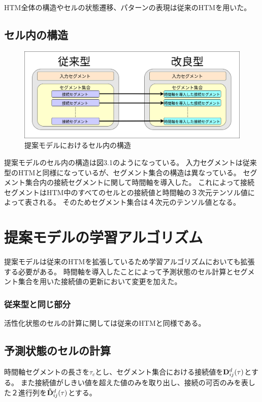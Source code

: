 HTM全体の構造やセルの状態遷移、パターンの表現は従来のHTMを用いた。

\subsection{セル内の構造}

\begin{figure}[ht]
  \begin{center}
    \includegraphics[width=14cm]{./fig/drawing_9}
    \caption{提案モデルにおけるセル内の構造}
    \label{fig:HTM_improved}
  \end{center}
\end{figure}

提案モデルのセル内の構造は図3.1のようになっている。
入力セグメントは従来型のHTMと同様になっているが、セグメント集合の構造は異なっている。
セグメント集合内の接続セグメントに関して時間軸を導入した。
これによって接続セグメントはHTM中のすべてのセルとの接続値と時間軸の３次元テンソル値によって表される。
そのためセグメント集合は４次元のテンソル値となる。

\section{提案モデルの学習アルゴリズム}
提案モデルは従来のHTMを拡張しているため学習アルゴリズムにおいても拡張する必要がある。
時間軸を導入したことによって予測状態のセル計算とセグメント集合を用いた接続値の更新において変更を加えた。

\subsubsection{従来型と同じ部分}

活性化状態のセルの計算に関しては従来のHTMと同様である。

\subsection{予測状態のセルの計算}
時間軸セグメントの長さを$\tau_c$とし、セグメント集合における接続値を${\bf D}^d_{ij}(\tau)$とする。
また接続値がしきい値を超えた値のみを取り出し、接続の可否のみを表した２進行列を${\bf \tilde{D}}^d_{ij}(\tau)$とする。

